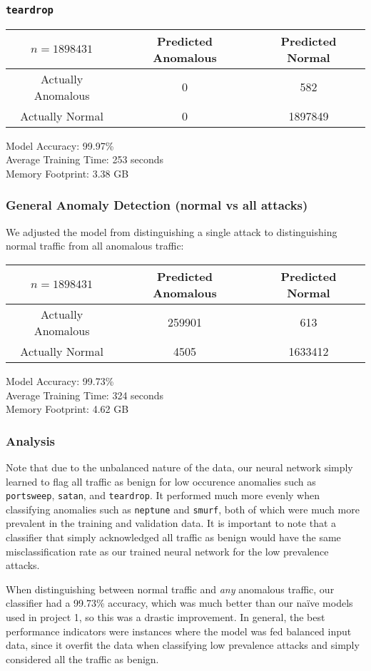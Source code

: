 \documentclass[letterpaper,12pt]{article}
\begin{document}
\subsubsection*{\texttt{teardrop}}
\begin{center}
  \begin{tabular}{c|c|c}
    \( n  = 1898431 \) & Predicted Anomalous & Predicted Normal \\
    \hline
    Actually Anomalous & 0 & 582 \\
    \hline
    Actually Normal & 0 & 1897849
  \end{tabular}
\end{center}
Model Accuracy: 99.97\% \\
Average Training Time: 253 seconds \\
Memory Footprint: 3.38 GB

\subsubsection*{General Anomaly Detection (normal vs all attacks)}
We adjusted the model from distinguishing a single attack to distinguishing
normal traffic from all anomalous traffic:
\begin{center}
  \begin{tabular}{c|c|c}
    \( n  = 1898431 \) & Predicted Anomalous & Predicted Normal \\
    \hline
    Actually Anomalous & 259901 & 613 \\
    \hline
    Actually Normal & 4505 & 1633412
  \end{tabular}
\end{center}
Model Accuracy: 99.73\% \\
Average Training Time: 324 seconds \\
Memory Footprint: 4.62 GB

\subsubsection*{Analysis}
Note that due to the unbalanced nature of the data, our neural network simply
learned to flag all traffic as benign for low occurence anomalies such as
\texttt{portsweep}, \texttt{satan}, and \texttt{teardrop}. It performed much
more evenly when classifying anomalies such as \texttt{neptune} and
\texttt{smurf}, both of which were much more prevalent in the training and
validation data. It is important to note that a classifier that simply
acknowledged all traffic as benign would have the same misclassification rate
as our trained neural network for the low prevalence attacks. \par
When distinguishing between normal traffic and \textit{any} anomalous traffic,
our classifier had a 99.73\% accuracy, which was much better than our na\"{i}ve
models used in project 1, so this was a drastic improvement. In general, the
best performance indicators were instances where the model was fed balanced
input data, since it overfit the data when classifying low prevalence attacks
and simply considered all the traffic as benign.
\end{document}
